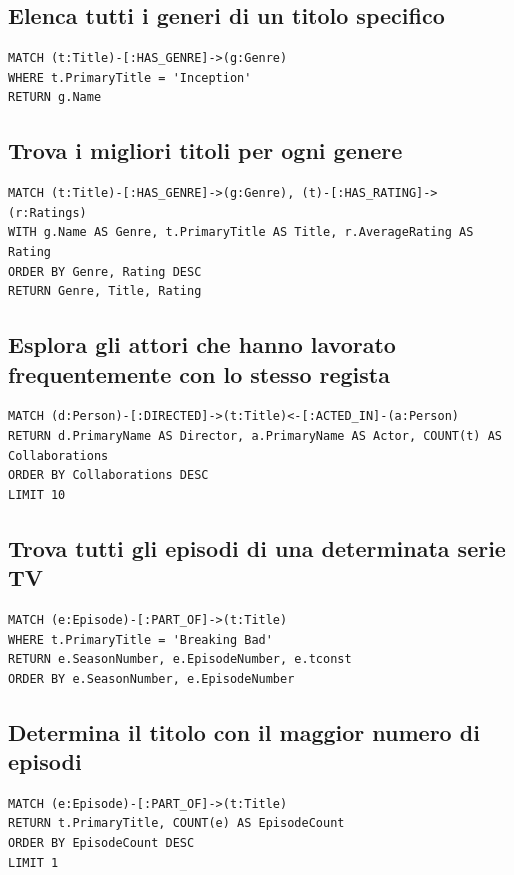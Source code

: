 \documentclass[a4paper,12pt]{article}
\begin{document}
\subsection{Elenca tutti i generi di un titolo specifico}
\begin{verbatim}
MATCH (t:Title)-[:HAS_GENRE]->(g:Genre)
WHERE t.PrimaryTitle = 'Inception'
RETURN g.Name
\end{verbatim}

\subsection{Trova i migliori titoli per ogni genere}
\begin{verbatim}
MATCH (t:Title)-[:HAS_GENRE]->(g:Genre), (t)-[:HAS_RATING]->(r:Ratings)
WITH g.Name AS Genre, t.PrimaryTitle AS Title, r.AverageRating AS Rating
ORDER BY Genre, Rating DESC
RETURN Genre, Title, Rating
\end{verbatim}

\subsection{Esplora gli attori che hanno lavorato frequentemente con lo stesso regista}
\begin{verbatim}
MATCH (d:Person)-[:DIRECTED]->(t:Title)<-[:ACTED_IN]-(a:Person)
RETURN d.PrimaryName AS Director, a.PrimaryName AS Actor, COUNT(t) AS Collaborations
ORDER BY Collaborations DESC
LIMIT 10
\end{verbatim}

\subsection{Trova tutti gli episodi di una determinata serie TV}
\begin{verbatim}
MATCH (e:Episode)-[:PART_OF]->(t:Title)
WHERE t.PrimaryTitle = 'Breaking Bad'
RETURN e.SeasonNumber, e.EpisodeNumber, e.tconst
ORDER BY e.SeasonNumber, e.EpisodeNumber
\end{verbatim}

\subsection{Determina il titolo con il maggior numero di episodi}
\begin{verbatim}
MATCH (e:Episode)-[:PART_OF]->(t:Title)
RETURN t.PrimaryTitle, COUNT(e) AS EpisodeCount
ORDER BY EpisodeCount DESC
LIMIT 1
\end{verbatim}
\end{document}

